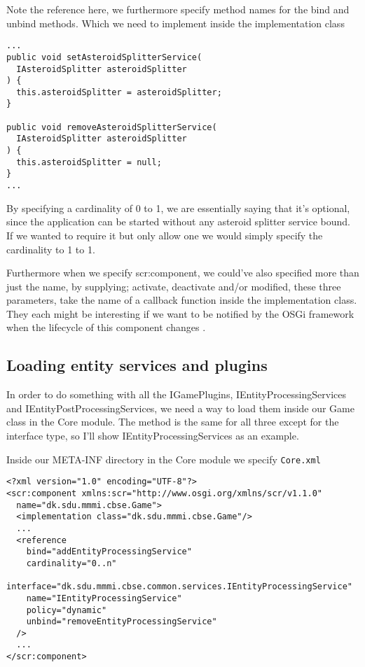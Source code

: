 Note the reference here, we furthermore specify method names for the bind and
unbind methods. Which we need to implement inside the implementation class
\begin{verbatim}
...
public void setAsteroidSplitterService(
  IAsteroidSplitter asteroidSplitter
) {
  this.asteroidSplitter = asteroidSplitter;
}

public void removeAsteroidSplitterService(
  IAsteroidSplitter asteroidSplitter
) {
  this.asteroidSplitter = null;
}
...
\end{verbatim}

By specifying a cardinality of 0 to 1, we are essentially saying that it's
optional, since the application can be started without any asteroid splitter
service bound. If we wanted to require it but only allow one we would simply
specify the cardinality to 1 to 1.

Furthermore when we specify scr:component, we could've also specified more than
just the name, by supplying; activate, deactivate and/or modified, these three
parameters, take the name of a callback function inside the implementation
class. They each might be interesting if we want to be
notified by the OSGi framework when the lifecycle of this component changes
\cite{ibm-osgi-demystified}.

\subsection{Loading entity services and plugins}
In order to do something with all the IGamePlugins, IEntityProcessingServices
and IEntityPostProcessingServices, we need a way to load them inside our Game
class in the Core module.
The method is the same for all three except for the interface type, so I'll show
IEntityProcessingServices as an example.

Inside our META-INF directory in the Core module we specify \texttt{Core.xml}

\begin{verbatim}
<?xml version="1.0" encoding="UTF-8"?>
<scr:component xmlns:scr="http://www.osgi.org/xmlns/scr/v1.1.0"
  name="dk.sdu.mmmi.cbse.Game">
  <implementation class="dk.sdu.mmmi.cbse.Game"/>
  ...
  <reference
    bind="addEntityProcessingService"
    cardinality="0..n"
    interface="dk.sdu.mmmi.cbse.common.services.IEntityProcessingService"
    name="IEntityProcessingService"
    policy="dynamic"
    unbind="removeEntityProcessingService"
  />
  ...
</scr:component>
\end{verbatim}

